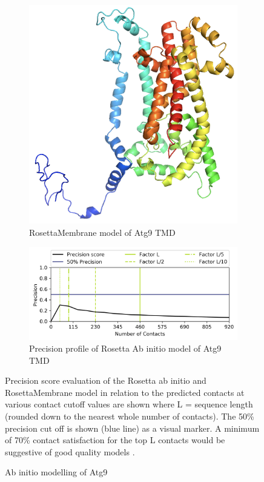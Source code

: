\begin{figure}[htb]
\begin{subfigure}{0.25\textwidth}
  \includegraphics[width=\linewidth]{Modelling of Atg9/atg_ros_mem.png}
  \caption{RosettaMembrane model of Atg9 TMD}
  \label{fig:1}
\end{subfigure}\hfil %
\begin{subfigure}{0.25\textwidth}
  \includegraphics[width=\linewidth]{Modelling of Atg9/prec_rosmem.png}
  \caption{Precision profile of Rosetta Ab initio model of Atg9 TMD}
  \label{fig:0}
\end{subfigure}\hfil %
\caption{Ab initio modelling of Atg9}
\small
Precision score evaluation of the Rosetta ab initio and RosettaMembrane model in relation to the predicted contacts at various contact cutoff values are shown where L = sequence length (rounded down to the nearest whole number of contacts). The 50\% precision cut off is shown (blue line) as a visual marker. A minimum of 70\% contact satisfaction for the top L contacts would be suggestive of good quality models \cite{DeOliveira2016}.
\label{fig:atg9_ab_models}
\end{figure}

